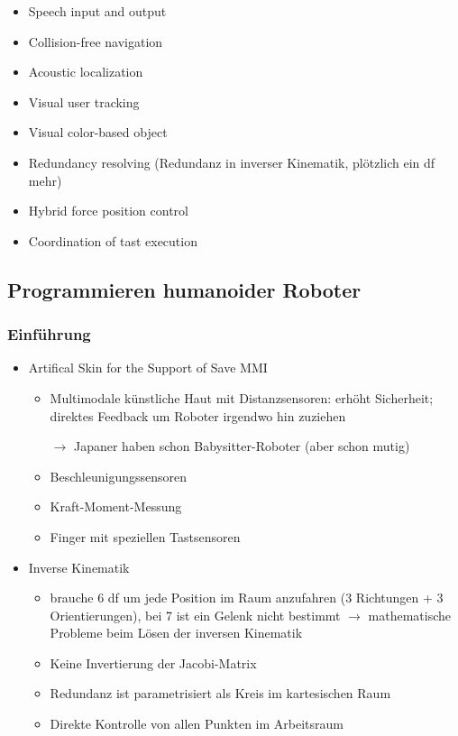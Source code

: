 \begin{itemize}
	\begin{itemize}
		\item Speech input and output
		\item Collision-free navigation
		\item Acoustic localization
		\item Visual user tracking
		\item Visual color-based object
		\item Redundancy resolving (Redundanz in inverser Kinematik, plötzlich ein df mehr)
		\item Hybrid force position control
		\item Coordination of tast execution
	\end{itemize}
\end{itemize}

\subsection{Programmieren humanoider Roboter}

\subsubsection{Einführung}
\begin{itemize}
	\item Artifical Skin for the Support of Save MMI
	\begin{itemize}
		 \item Multimodale künstliche Haut mit Distanzsensoren: erhöht Sicherheit; direktes Feedback um Roboter irgendwo hin zuziehen
		 \item[$\rightarrow$] Japaner haben schon Babysitter-Roboter (aber schon mutig)
		 \item Beschleunigungssensoren
		 \item Kraft-Moment-Messung
		 \item Finger mit speziellen Tastsensoren
	\end{itemize}
	\item Inverse Kinematik
	\begin{itemize}
		\item brauche 6 df um jede Position im Raum anzufahren (3 Richtungen + 3 Orientierungen), bei 7 ist ein Gelenk nicht bestimmt $\rightarrow$ mathematische Probleme beim Lösen der inversen Kinematik
		\item Keine Invertierung der Jacobi-Matrix
		\item Redundanz ist parametrisiert als Kreis im kartesischen Raum
		\item Direkte Kontrolle von allen Punkten im Arbeitsraum
	\end{itemize}
\end{itemize}

